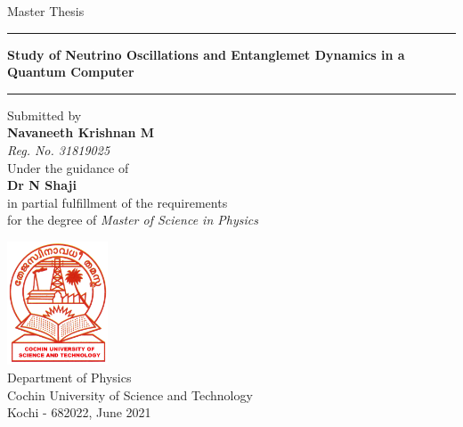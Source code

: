 \documentclass[12pt,a4paper]{report}
\begin{document}
\begin{titlepage}%
\begin{center}

{\Large Master Thesis}
\vspace{0.5cm}
\hrule  %
\linespread{1}
{\huge \bfseries Study of Neutrino Oscillations and Entanglemet Dynamics in a Quantum Computer}\vspace{0.5cm} %
\hrule %
\linespread{1}
\vspace{0.5cm}
{Submitted by}\\
\vspace{0.1cm}
{\Large\textbf{Navaneeth Krishnan M}}\\
\vspace{0.1cm}
\textit{Reg. No. 31819025}
\vspace{0.5cm}\\
{Under the guidance of }\\
\vspace{0.1cm}
{\Large\textbf{Dr N Shaji}}
\vspace{1cm}\\
 \large in partial fulfillment of the requirements\\
\large for the degree of \emph{Master of Science in Physics}\\
\vspace{0.5cm}
\graphicspath{ {./Images/} }
\centering	
{\includegraphics[width=3cm]{cusat.png}}\\
\vspace{0.5cm}
Department of Physics\\
Cochin University of Science and Technology\\
Kochi - 682022, June 2021\\
\end{center}
\end{titlepage}
\newpage
\thispagestyle{empty}

\end{document}
